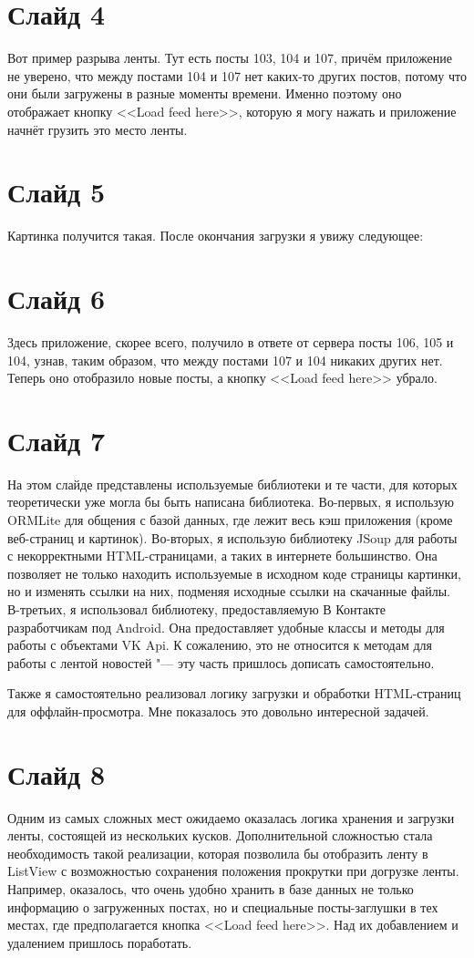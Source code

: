 \documentclass[a4paper]{article}
\begin{document}
\section{Слайд 4}
Вот пример разрыва ленты.
Тут есть посты 103, 104 и 107, причём приложение не уверено, что между постами 104 и 107 нет каких-то других постов,
потому что они были загружены в разные моменты времени.
Именно поэтому оно отображает кнопку <<Load feed here>>, которую я могу нажать и приложение начнёт грузить это место ленты.

\section{Слайд 5}
Картинка получится такая.
После окончания загрузки я увижу следующее:

\section{Слайд 6}
Здесь приложение, скорее всего, получило в ответе от сервера посты 106, 105 и 104, узнав, таким образом,
что между постами 107 и 104 никаких других нет.
Теперь оно отобразило новые посты, а кнопку <<Load feed here>> убрало.

\section{Слайд 7}
На этом слайде представлены используемые библиотеки и те части, для которых теоретически уже могла бы быть написана библиотека.
Во-первых, я использую ORMLite для общения с базой данных, где лежит весь кэш приложения (кроме веб-страниц и картинок).
Во-вторых, я использую библиотеку JSoup для работы с некорректными HTML-страницами, а таких в интернете большинство.
Она позволяет не только находить используемые в исходном коде страницы картинки, но и изменять ссылки на них, подменяя исходные
ссылки на скачанные файлы.
В-третьих, я использовал библиотеку, предоставляемую В Контакте разработчикам под Android.
Она предоставляет удобные классы и методы для работы с объектами VK Api.
К сожалению, это не относится к методам для работы с лентой новостей "--- эту часть пришлось дописать самостоятельно.

Также я самостоятельно реализовал логику загрузки и обработки HTML-страниц для оффлайн-просмотра.
Мне показалось это довольно интересной задачей.

\section{Слайд 8}
Одним из самых сложных мест ожидаемо оказалась логика хранения и загрузки ленты, состоящей из нескольких кусков.
Дополнительной сложностью стала необходимость такой реализации, которая позволила бы отобразить ленту в ListView
с возможностью сохранения положения прокрутки при догрузке ленты.
Например, оказалось, что очень удобно хранить в базе данных не только информацию о загруженных постах,
но и специальные посты-заглушки в тех местах, где предполагается кнопка <<Load feed here>>.
Над их добавлением и удалением пришлось поработать.
\end{document}
